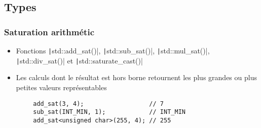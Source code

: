 \documentclass[C++.tex]{subfiles}
\begin{document}
\subsection*{Types}
\begin{frame}[fragile]
	\frametitle{Saturation arithmétic}
	\begin{itemize}
		\item Fonctions \texttt|std::add_sat()|, \texttt|std::sub_sat()|, \texttt|std::mul_sat()|, \texttt|std::div_sat()| et \texttt|std::saturate_cast()|
		\item Les calculs dont le résultat est hors borne retournent les plus grandes ou plus petites valeurs représentables
	\end{itemize}

	\begin{verbatim}
		add_sat(3, 4);                  // 7
		sub_sat(INT_MIN, 1);            // INT_MIN
		add_sat<unsigned char>(255, 4); // 255
	\end{verbatim}


\end{frame}
\end{document}
